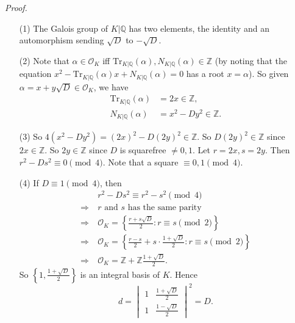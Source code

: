 \documentclass{article}
\begin{document}
\emph{Proof.}
\begin{enumerate}
\item[(1)]
  The Galois group of $K|\mathbb{Q}$ has two elements, the identity
  and an automorphism sending $\sqrt{D}$ to $-\sqrt{D}$.

\item[(2)]
  Note that $\alpha \in \mathcal{O}_K$
  iff $\mathrm{Tr}_{K|\mathbb{Q}}(\alpha), N_{K|\mathbb{Q}}(\alpha) \in \mathbb{Z}$
  (by noting that the equation
  $x^2 - \mathrm{Tr}_{K|\mathbb{Q}}(\alpha) x + N_{K|\mathbb{Q}}(\alpha) = 0$ has
  a root $x = \alpha$).
  So given $\alpha = x + y \sqrt{D} \in \mathcal{O}_K$, we have
  \begin{align*}
    \mathrm{Tr}_{K|\mathbb{Q}}(\alpha) &= 2x \in \mathbb{Z}, \\
    N_{K|\mathbb{Q}}(\alpha) &= x^2 - D y^2 \in \mathbb{Z}.
  \end{align*}

\item[(3)]
  So $4(x^2 - D y^2) = (2x)^2 - D(2y)^2 \in \mathbb{Z}$.
  So $D(2y)^2 \in \mathbb{Z}$ since $2x \in \mathbb{Z}$.
  So $2y \in \mathbb{Z}$ since $D$ is squarefree $\neq 0, 1$.
  Let $r = 2x, s = 2y$.
  Then $r^2 - Ds^2 \equiv 0 \pmod 4$.
  Note that a square $\equiv 0, 1 \pmod 4$.

\item[(4)]
  If $D \equiv 1 \pmod 4$, then
  \begin{align*}
    &\:r^2 - Ds^2 \equiv r^2 - s^2 \pmod 4 \\
    \Longrightarrow &\:
    \text{$r$ and $s$ has the same parity} \\
    \Longrightarrow &\:
    \mathcal{O}_K = \left\{ \frac{r+s\sqrt{D}}{2} : r \equiv s \pmod 2 \right\} \\
    \Longrightarrow &\:
    \mathcal{O}_K = \left\{ \frac{r-s}{2} + s \cdot \frac{1+\sqrt{D}}{2}
      : r \equiv s \pmod 2 \right\} \\
    \Longrightarrow &\:
    \mathcal{O}_K = \mathbb{Z} + \mathbb{Z} \frac{1+\sqrt{D}}{2}.
  \end{align*}
  So $\left\{ 1, \frac{1+\sqrt{D}}{2} \right\}$ is an integral basis of $K$.
  Hence
  \[
    d
    =
    \begin{vmatrix}
      1 & \frac{1+\sqrt{D}}{2} \\
      1 & \frac{1-\sqrt{D}}{2}
    \end{vmatrix}^2
    = D.
  \]


\end{enumerate}
\end{document}
